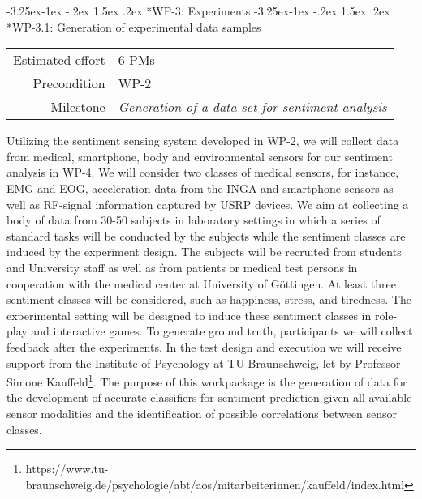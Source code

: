 \documentclass[12pt]{article}
\makeatletter
\newcommand{\kobyc}[1]{\begin{center}\fbox{\parbox{3in}{{\textcolor{green}{K: #1}}}}\end{center}}
\renewcommand\paragraph{\@startsection{paragraph}{4}{\z@}%
  {-3.25ex\@plus -1ex \@minus -.2ex}%
  {1.5ex \@plus .2ex}%
  {\normalfont\normalsize\bfseries}}
\makeatother
\begin{document}
\paragraph*{WP-3: Experiments}
\paragraph*{WP-3.1: Generation of experimental data samples}
\begin{tabular}{rl}
 Estimated effort& 6 PMs\\
 Precondition & WP-2\\
 Milestone & \begin{minipage}[t]{12.2cm}
\textit{Generation of a data set for sentiment analysis}\vspace{.2cm}
             \end{minipage}
\end{tabular}

\noindent
Utilizing the sentiment sensing system developed in WP-2, we will collect data from medical, smartphone, body and environmental sensors for our sentiment analysis in WP-4. 
We will consider two classes of medical sensors, for instance, EMG and EOG, acceleration data from the INGA and smartphone sensors as well as RF-signal information captured by USRP devices. 
We aim at collecting a body of data from 30-50 subjects in laboratory settings in which a series of standard tasks will be conducted by the subjects while the sentiment classes are induced by the experiment design. 
The subjects will be recruited from students and University staff as well as from patients or medical test persons in cooperation with the medical center at University of Göttingen.
At least three sentiment classes will be considered, such as happiness, stress, and tiredness. 
The experimental setting will be designed to induce these sentiment classes in role-play and interactive games.
To generate ground truth, participants we will collect feedback after the experiments. 
In the test design and execution we will receive support from the Institute of Psychology at TU Braunschweig, let by Professor Simone Kauffeld\footnote{https://www.tu-braunschweig.de/psychologie/abt/aos/mitarbeiterinnen/kauffeld/index.html}.
The purpose of this workpackage is the generation of data for the development of accurate classifiers for sentiment prediction given all available sensor modalities and the identification of possible correlations between sensor classes.
\end{document}
